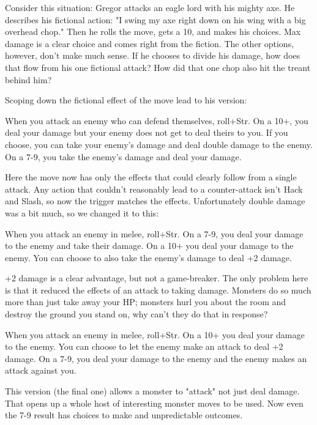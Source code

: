  

Consider this situation: Gregor attacks an eagle lord with his mighty axe. He describes his fictional action: "I swing my axe right down on his wing with a big overhead chop." Then he rolls the move, gets a 10, and makes his choices. Max damage is a clear choice and comes right from the fiction. The other options, however, don't make much sense. If he chooses to divide his damage, how does that flow from his one fictional attack? How did that one chop also hit the treant behind him?

 

Scoping down the fictional effect of the move lead to his version:

 
\startExample
When you attack an enemy who can defend themselves, roll+Str. On a 10+, you deal your damage but your enemy does not get to deal theirs to you. If you choose, you can take your enemy's damage and deal double damage to the enemy. On a 7-9, you take the enemy's damage and deal your damage.
\stopExample
 

Here the move now has only the effects that could clearly follow from a single attack. Any action that couldn't reasonably lead to a counter-attack isn't Hack and Slash, so now the trigger matches the effects. Unfortunately double damage was a bit much, so we changed it to this:

 
\startExample
When you attack an enemy in melee, roll+Str. On a 7-9, you deal your damage to the enemy and take their damage. On a 10+ you deal your damage to the enemy. You can choose to also take the enemy's damage to deal +2 damage.
\stopExample
 

+2 damage is a clear advantage, but not a game-breaker. The only problem here is that it reduced the effects of an attack to taking damage. Monsters do so much more than just take away your HP; monsters hurl you about the room and destroy the ground you stand on, why can't they do that in response?

 
\startExample
When you attack an enemy in melee, roll+Str. On a 10+ you deal your damage to the enemy. You can choose to let the enemy make an attack to deal +2 damage. On a 7-9, you deal your damage to the enemy and the enemy makes an attack against you.
\stopExample
 

This version (the final one) allows a monster to "attack" not just deal damage. That opens up a whole host of interesting monster moves to be used. Now even the 7-9 result has choices to make and unpredictable outcomes.


